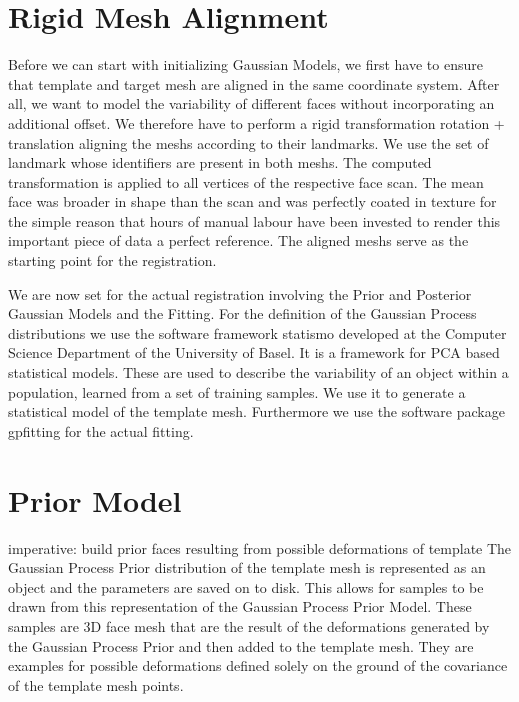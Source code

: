\section{Rigid Mesh Alignment}
Before we can start with initializing Gaussian Models, we first have to ensure that template and target mesh are aligned in the same coordinate system. After all, we want to model the variability of different faces without incorporating an additional offset. We therefore have to perform a rigid transformation  
rotation + translation
aligning the meshs according to their landmarks.  We use the set of landmark whose identifiers are present in both meshs.
The computed transformation is applied to all vertices of the respective face scan. 
The mean face was broader in shape than the scan and was perfectly coated in texture for the simple reason that hours of manual labour have been invested to render this important piece of data a perfect reference.
The aligned meshs serve as the starting point for the registration.

We are now set for the actual registration involving the Prior and Posterior Gaussian Models and the Fitting. For the definition of the Gaussian Process distributions we use the software framework statismo developed at the Computer Science Department of the University of Basel. It is a framework for PCA based statistical models. These are used to describe the variability of an object within a population, learned from a set of training samples. We use it to generate a
statistical model of the template mesh. Furthermore we use the software package gpfitting for the actual fitting. 

\section{Prior Model}
imperative: build prior faces resulting from possible deformations of template
The Gaussian Process Prior distribution of the template mesh is represented as an object and the parameters are saved on to disk. This allows for samples to be drawn from this representation of the Gaussian Process Prior Model. These samples are 3D face mesh that are the result of the deformations generated by the Gaussian Process Prior and then added to the template mesh. They are examples for possible deformations defined solely on the ground of the covariance of the template mesh points.

